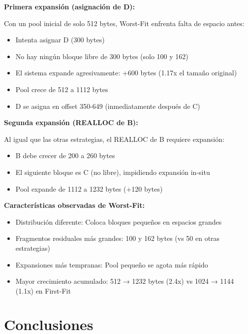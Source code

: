 \documentclass[12pt,a4paper]{article}
\begin{document}
\textbf{Primera expansión (asignación de D):}

Con un pool inicial de solo 512 bytes, Worst-Fit enfrenta falta de espacio antes:
\begin{itemize}
    \item Intenta asignar D (300 bytes)
    \item No hay ningún bloque libre de 300 bytes (solo 100 y 162)
    \item El sistema expande agresivamente: +600 bytes (1.17x el tamaño original)
    \item Pool crece de 512 a 1112 bytes
    \item D se asigna en offset 350-649 (inmediatamente después de C)
\end{itemize}

\textbf{Segunda expansión (REALLOC de B):}

Al igual que las otras estrategias, el REALLOC de B requiere expansión:
\begin{itemize}
    \item B debe crecer de 200 a 260 bytes
    \item El siguiente bloque es C (no libre), impidiendo expansión in-situ
    \item Pool expande de 1112 a 1232 bytes (+120 bytes)
\end{itemize}

\textbf{Características observadas de Worst-Fit:}
\begin{itemize}
    \item Distribución diferente: Coloca bloques pequeños en espacios grandes
    \item Fragmentos residuales más grandes: 100 y 162 bytes (vs 50 en otras estrategias)
    \item Expansiones más tempranas: Pool pequeño se agota más rápido
    \item Mayor crecimiento acumulado: 512 → 1232 bytes (2.4x) vs 1024 → 1144 (1.1x) en First-Fit
\end{itemize}

\section{Conclusiones}
\end{document}
